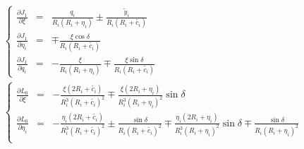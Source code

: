 \documentclass{jarticle}
\newcommand{\yy}[1]{\tilde{y}_#1}
\newcommand{\re}[1]{R_#1+\eta_#1}
\newcommand{\rc}[1]{R_#1+\tilde{c_#1}}
\begin{document}
\begin{eqnarray*}
&&\left\{
\begin{array}{lcl}
  \displaystyle \frac{\partial J_1}{\partial \xi}
  &=&
  \displaystyle \frac{q_i}{R_i(\re{i})}\pm\frac{\yy{i}}{R_i(\rc{i})}\\
%
  \displaystyle \frac{\partial J_1}{\partial \eta_i}
  &=&
  \displaystyle \mp\frac{\xi\cos\delta}{R_i(\rc{i})}\\
%
  \displaystyle \frac{\partial J_1}{\partial q_i}
  &=&
  \displaystyle -\frac{\xi}{R_i(\re{i})}\mp\frac{\xi\sin\delta}{R_i(\rc{i})}
\end{array}
\right.\\
&&\left\{
\begin{array}{lcl}
  \displaystyle \frac{\partial L_0}{\partial \xi}
  &=&
  \displaystyle -\frac{\xi(2\rc{i})}{R_i^3(\rc{i})^2}
  \mp\frac{\xi(2\re{i})}{R_i^3(\re{i})^2}\sin\delta\\
%
  \displaystyle \frac{\partial L_0}{\partial \eta_i}
  &=&
  \displaystyle -\frac{\eta_i(2\rc{i})}{R_i^3(\rc{i})^2}
  \pm\frac{\sin\delta}{R_i(\rc{i})^2}
  \mp\frac{\eta_i(2\re{i})}{R_i^3(\re{i})^2}\sin\delta
  \mp\frac{\sin\delta}{R_i(\re{i})^2}\\


\end{array}
\end{eqnarray*}
\end{document}
